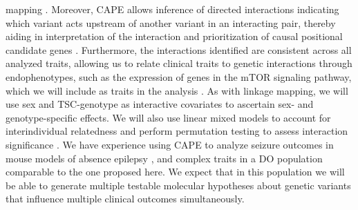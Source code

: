 \documentclass[
  12pt,
]{article}
\begin{document}
mapping \cite{28592500}. Moreover, CAPE allows inference of directed
interactions indicating which variant acts upstream of another variant
in an interacting pair, thereby aiding in interpretation of the
interaction and prioritization of causal positional candidate genes
\cite{26828925, 31694854}. Furthermore, the interactions identified are
consistent across all analyzed traits, allowing us to relate clinical
traits to genetic interactions through endophenotypes, such as the
expression of genes in the mTOR signaling pathway, which we will include
as traits in the analysis \cite{26828925, 28592500, 24297548}. As with
linkage mapping, we will use sex and TSC-genotype as interactive
covariates to ascertain sex- and genotype-specific effects. We will also
use linear mixed models to account for interindividual relatedness
\cite{33892506} and perform permutation testing to assess interaction
significance \cite{8770605}. We have experience using CAPE to analyze
seizure outcomes in mouse models of absence epilepsy \cite{25251056},
and complex traits in a DO population \cite{28592500} comparable to the
one proposed here. We expect that in this population we will be able to
generate multiple testable molecular hypotheses about genetic variants
that influence multiple clinical outcomes simultaneously.
\end{document}
